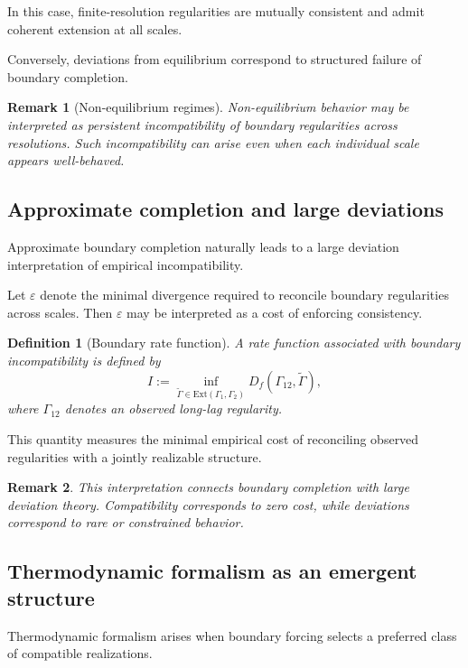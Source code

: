 \documentclass[11pt]{article}
\newtheorem{definition}{Definition}
\newtheorem{remark}{Remark}
\newcommand{\Ext}{\mathrm{Ext}} 	%
\begin{document}
In this case, finite-resolution regularities are mutually consistent and
admit coherent extension at all scales.

Conversely, deviations from equilibrium correspond to structured failure of
boundary completion.

\begin{remark}[Non-equilibrium regimes]
Non-equilibrium behavior may be interpreted as persistent incompatibility of
boundary regularities across resolutions.
Such incompatibility can arise even when each individual scale appears
well-behaved.
\end{remark}

\subsection{Approximate completion and large deviations}

Approximate boundary completion naturally leads to a large deviation
interpretation of empirical incompatibility.

Let $\varepsilon$ denote the minimal divergence required to reconcile
boundary regularities across scales.
Then $\varepsilon$ may be interpreted as a cost of enforcing consistency.

\begin{definition}[Boundary rate function]
A rate function associated with boundary incompatibility is defined by
\[
I := \inf_{\widetilde\Gamma \in \Ext(\Gamma_1,\Gamma_2)}
D_f(\Gamma_{12},\widetilde\Gamma),
\]
where $\Gamma_{12}$ denotes an observed long-lag regularity.
\end{definition}

This quantity measures the minimal empirical cost of reconciling observed
regularities with a jointly realizable structure.

\begin{remark}
This interpretation connects boundary completion with large deviation theory.
Compatibility corresponds to zero cost, while deviations correspond to
rare or constrained behavior.
\end{remark}

\subsection{Thermodynamic formalism as an emergent structure}

Thermodynamic formalism arises when boundary forcing selects a preferred
class of compatible realizations.
\end{document}
